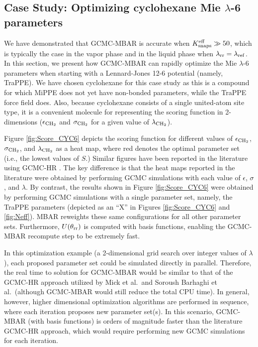 \documentclass[journal=jced,manuscript=article]{achemso}
\begin{document}
\subsection{Case Study: Optimizing cyclohexane Mie $\lambda$-6 parameters} \label{sec: Case study}

We have demonstrated that GCMC-MBAR is accurate when $K_{\rm snaps}^{\rm eff} \gg 50$, which is typically the case in the vapor phase and in the liquid phase when $\lambda_{\rm rr} = \lambda_{\rm ref}$. In this section, we present how GCMC-MBAR can rapidly optimize the Mie $\lambda$-6 parameters when starting with a Lennard-Jones 12-6 potential (namely, TraPPE). We have chosen cyclohexane for this case study as this is a compound for which MiPPE does not yet have non-bonded parameters, while the TraPPE force field does. Also, because cyclohexane consists of a single united-atom site type, it is a convenient molecule for representing the scoring function in 2-dimensions ($\epsilon_{\rm CH_2}$ and $\sigma_{\rm CH_2}$ for a given value of $\lambda_{\rm CH_2}$).

Figure \ref{fig:Score_CYC6} depicts the scoring function for different values of $\epsilon_{\rm CH_2}$, $\sigma_{\rm CH_2}$, and $\lambda_{\rm CH_2}$ as a heat map, where red denotes the optimal parameter set (i.e., the lowest values of $S$.) Similar figures have been reported in the literature using GCMC-HR \cite{Potoff_branched,Barhaghi2017}. The key difference is that the heat maps reported in the literature were obtained by performing GCMC simulations with each value of $\epsilon$, $\sigma$, and $\lambda$. By contrast, the results shown in Figure \ref{fig:Score_CYC6} were obtained by performing GCMC simulations with a single parameter set, namely, the TraPPE parameters (depicted as an ``X'' in Figures \ref{fig:Score_CYC6} and \ref{fig:Neff}). MBAR reweights these same configurations for all other parameter sets. Furthermore, $U(\theta_{\rm rr})$ is computed with basis functions, enabling the GCMC-MBAR recompute step to be extremely fast. 

In this optimization example (a 2-dimensional grid search over integer values of $\lambda$), each proposed parameter set could be simulated directly in parallel. Therefore, the real time to solution for GCMC-MBAR would be similar to that of the GCMC-HR approach utilized by Mick et al.~and Soroush Barhaghi et al.~(although GCMC-MBAR would still reduce the total CPU time). In general, however, higher dimensional optimization algorithms are performed in sequence, where each iteration proposes new parameter set(s). In this scenario, GCMC-MBAR (with basis functions) is orders of magnitude faster than the literature GCMC-HR approach, which would require performing new GCMC simulations for each iteration. 
\end{document}
